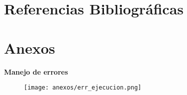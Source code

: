 \documentclass[12pt,letterpaper]{article}
\begin{document}
\section{Referencias Bibliográficas}
\printbibliography[heading=none]


\section{Anexos}

\textbf{Manejo de errores}

\begin{figure}[H]
    \centering
    \texttt{[image: anexos/err\_ejecucion.png]}
\end{figure}
\end{document}
